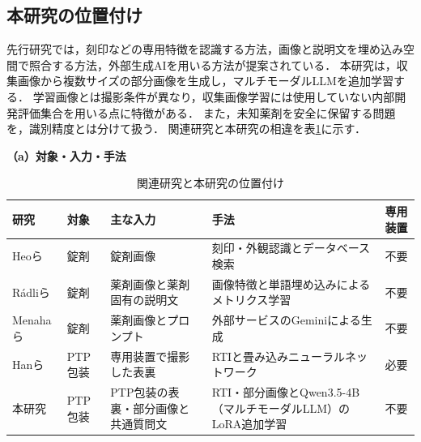 \documentclass[uplatex,dvipdfmx]{jsarticle}
\begin{document}
\subsection{本研究の位置付け}

先行研究では，刻印などの専用特徴を認識する方法，画像と説明文を埋め込み空間で照合する方法，外部生成AIを用いる方法が提案されている．
本研究は，収集画像から複数サイズの部分画像を生成し，マルチモーダルLLMを追加学習する．
学習画像とは撮影条件が異なり，収集画像学習には使用していない内部開発評価集合を用いる点に特徴がある．
また，未知薬剤を安全に保留する問題を，識別精度とは分けて扱う．
関連研究と本研究の相違を表\ref{tab:related_comparison}に示す．

\begin{table}[H]
  \centering
  \caption{関連研究と本研究の位置付け}
  \label{tab:related_comparison}
  \small
  \renewcommand{\arraystretch}{1.25}
  \setlength{\tabcolsep}{3.5pt}
  \textbf{（a）対象・入力・手法}\\[1mm]
  \begin{tabularx}{\textwidth}{|>{\raggedright\arraybackslash}p{1.55cm}|>{\raggedright\arraybackslash}p{1.4cm}|>{\raggedright\arraybackslash}X|>{\raggedright\arraybackslash}X|>{\centering\arraybackslash}p{1.25cm}|}
    \hline
    研究 & 対象 & 主な入力 & 手法 & 専用装置 \\ \hline
    Heoら\cite{heo2023pill} & 錠剤 & 錠剤画像 & 刻印・外観認識とデータベース検索 & 不要 \\ \hline
    Rádliら\cite{radli2024word,radli2024metric} & 錠剤 & 薬剤画像と薬剤固有の説明文 & 画像特徴と単語埋め込みによるメトリクス学習 & 不要 \\ \hline
    Menahaら\cite{menaha2024gemini} & 錠剤 & 薬剤画像とプロンプト & 外部サービスのGeminiによる生成 & 不要 \\ \hline
    Hanら\cite{han2021blister} & PTP包装 & 専用装置で撮影した表裏 & RTIと畳み込みニューラルネットワーク & 必要 \\ \hline
    本研究 & PTP包装 & PTP包装の表裏・部分画像と共通質問文 & RTI・部分画像とQwen3.5-4B（マルチモーダルLLM）のLoRA追加学習 & 不要 \\ \hline
  \end{tabularx}


\end{table}
\end{document}
